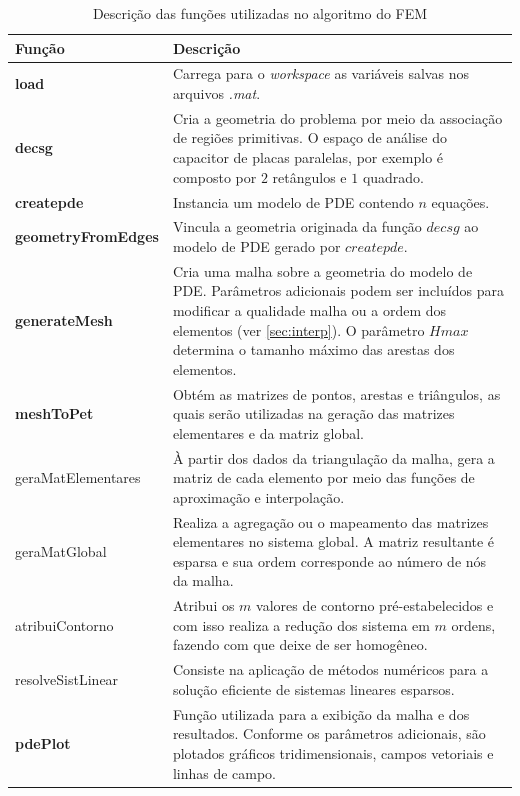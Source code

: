 \documentclass[
    12pt,               %
    openright,          %
    oneside,
    a4paper,            %
    english,            %
    french,             %
    spanish,            %
    brazil              %
    ]{abntex2}
\begin{document}
\begin{table}[!ht]   
	\centering
	\begin{tabular}{|l|p{10cm}|}  
		\hline
		\textbf{Função} 
		& \textbf{Descrição} 
		\\  
		\hline
		\textbf{load} 
		& Carrega para o \textit{workspace} as variáveis salvas nos arquivos \textit{.mat}. 
		\\
		\hline
		\textbf{decsg}  
		& Cria a geometria do problema por meio da associação de regiões primitivas. O espaço de análise do capacitor de placas paralelas, por exemplo é composto por $2$ retângulos e $1$ quadrado.
		\\
		\hline		
		\textbf{createpde} 
		& Instancia um modelo de PDE contendo $n$ equações.
		\\
		\hline		 
		\textbf{geometryFromEdges} 
		& Vincula a geometria originada da função $decsg$ ao modelo de PDE gerado por $createpde$.
		\\
		\hline		
		\textbf{generateMesh} 
		& Cria uma malha sobre a geometria do modelo de PDE. Parâmetros adicionais podem ser incluídos para modificar a qualidade malha ou a ordem dos elementos (ver \ref{sec:interp}). O parâmetro $Hmax$ determina o tamanho máximo das arestas dos elementos.
		\\
		\hline		 
		\textbf{meshToPet} 
		& Obtém as matrizes de pontos, arestas e triângulos, as quais serão utilizadas na geração das matrizes elementares e da matriz global.
		\\
		\hline	
		geraMatElementares
		& À partir dos dados da triangulação da malha, gera a matriz de cada elemento por meio das funções de aproximação e interpolação.
		\\
		\hline
		geraMatGlobal
		& Realiza a agregação ou o mapeamento das matrizes elementares no sistema global. A matriz resultante é esparsa e sua ordem corresponde ao número de nós da malha.
		\\
		\hline
		atribuiContorno  
		& Atribui os $m$ valores de contorno pré-estabelecidos e com isso realiza a redução dos sistema em $m$ ordens, fazendo com que deixe de ser homogêneo.
		\\
		\hline
		resolveSistLinear
		& Consiste na aplicação de métodos numéricos para a solução eficiente de sistemas lineares esparsos.
		\\
		\hline		 
		\textbf{pdePlot}  
		& Função utilizada para a exibição da malha e dos resultados. Conforme os parâmetros adicionais, são plotados gráficos tridimensionais, campos vetoriais e linhas de campo.
		\\
		\hline	
	\end{tabular}
	\caption{Descrição das funções utilizadas no algoritmo do FEM}
	\label{tab:matlabFun}
\end{table}
 
\end{document}
